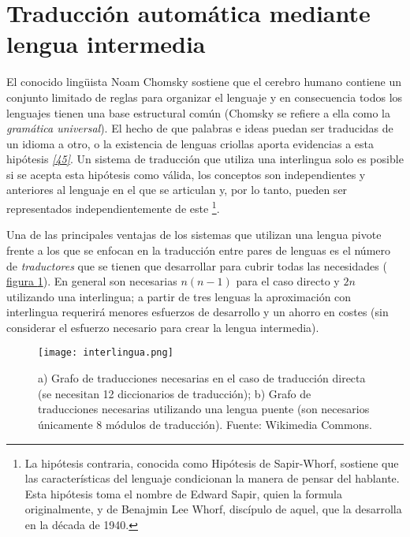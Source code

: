 \documentclass[a4paper,12pt,spanish]{book}
\begin{document}
\section{Traducción automática mediante lengua intermedia}
\label{0.intro:traduccion-automatica-mediante-lengua-intermedia}
El conocido lingüista Noam Chomsky sostiene que el cerebro humano contiene un
conjunto limitado de reglas para organizar el lenguaje y en consecuencia todos
los lenguajes tienen una base estructural común (Chomsky se refiere a ella como
la \emph{gramática universal}). El hecho de que palabras e ideas puedan ser traducidas
de un idioma a otro, o la existencia de lenguas criollas aporta evidencias a esta
hipótesis \label{0.intro:id23}{\hyperref[zreferences:kottak2002]{\emph{{[}45{]}}}}. Un sistema de traducción que utiliza una interlingua
solo es posible si se acepta esta hipótesis como válida, los conceptos son independientes
y anteriores al lenguaje en el que se articulan y, por lo tanto, pueden ser representados
independientemente de este \footnote{
La hipótesis contraria, conocida como Hipótesis de Sapir-Whorf, sostiene que
las características del lenguaje condicionan la manera de pensar del hablante. Esta
hipótesis toma el nombre de Edward Sapir, quien la formula originalmente, y de
Benajmin Lee Whorf, discípulo de aquel, que la desarrolla en la década de 1940.
}.

Una de las principales ventajas de los sistemas que utilizan una lengua pivote frente a
los que se enfocan en la traducción entre pares de lenguas es el número de \emph{traductores}
que se tienen que desarrollar para cubrir todas las necesidades (
\hyperref[0.intro:fig-interlingua]{figura  \ref*{0.intro:fig-interlingua}}). En general son necesarias \(n(n-1)\) para el caso directo
y \(2n\) utilizando una interlingua; a partir de tres lenguas la aproximación con
interlingua requerirá menores esfuerzos de desarrollo y un ahorro en costes (sin
considerar el esfuerzo necesario para crear la lengua intermedia).
\begin{figure}[htbp]
\centering
\capstart

\texttt{[image: interlingua.png]}
\caption[Traducción directa y traducción con lengua intermedia.]{a) Grafo de traducciones necesarias en el caso de traducción directa
(se necesitan 12 diccionarios de traducción); b) Grafo de traducciones necesarias
utilizando una lengua puente (son necesarios únicamente 8 módulos de traducción).
Fuente: Wikimedia Commons.}\label{0.intro:fig-interlingua}\end{figure}
\end{document}

